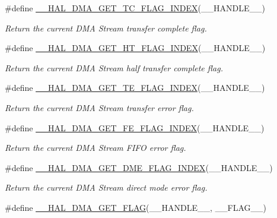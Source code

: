 \begin{DoxyCompactItemize}
\#define \hyperlink{group___d_m_a_gae3feef5ea50ff13a6a5b98cb353c87b0}{\+\_\+\+\_\+\+H\+A\+L\+\_\+\+D\+M\+A\+\_\+\+G\+E\+T\+\_\+\+T\+C\+\_\+\+F\+L\+A\+G\+\_\+\+I\+N\+D\+EX}(\+\_\+\+\_\+\+H\+A\+N\+D\+L\+E\+\_\+\+\_\+)
\begin{DoxyCompactList}\small\item\em Return the current D\+MA Stream transfer complete flag. \end{DoxyCompactList}\item 
\#define \hyperlink{group___d_m_a_ga0095f5f3166a82bedc67744ac94acfba}{\+\_\+\+\_\+\+H\+A\+L\+\_\+\+D\+M\+A\+\_\+\+G\+E\+T\+\_\+\+H\+T\+\_\+\+F\+L\+A\+G\+\_\+\+I\+N\+D\+EX}(\+\_\+\+\_\+\+H\+A\+N\+D\+L\+E\+\_\+\+\_\+)
\begin{DoxyCompactList}\small\item\em Return the current D\+MA Stream half transfer complete flag. \end{DoxyCompactList}\item 
\#define \hyperlink{group___d_m_a_ga5e765bb3b1c5fc9f1b1abbbb764250bc}{\+\_\+\+\_\+\+H\+A\+L\+\_\+\+D\+M\+A\+\_\+\+G\+E\+T\+\_\+\+T\+E\+\_\+\+F\+L\+A\+G\+\_\+\+I\+N\+D\+EX}(\+\_\+\+\_\+\+H\+A\+N\+D\+L\+E\+\_\+\+\_\+)
\begin{DoxyCompactList}\small\item\em Return the current D\+MA Stream transfer error flag. \end{DoxyCompactList}\item 
\#define \hyperlink{group___d_m_a_ga5878c3a1dbcf01e6840fffcf1f244088}{\+\_\+\+\_\+\+H\+A\+L\+\_\+\+D\+M\+A\+\_\+\+G\+E\+T\+\_\+\+F\+E\+\_\+\+F\+L\+A\+G\+\_\+\+I\+N\+D\+EX}(\+\_\+\+\_\+\+H\+A\+N\+D\+L\+E\+\_\+\+\_\+)
\begin{DoxyCompactList}\small\item\em Return the current D\+MA Stream F\+I\+FO error flag. \end{DoxyCompactList}\item 
\#define \hyperlink{group___d_m_a_ga23d1f282af3b9aa7aa396dcad94865d8}{\+\_\+\+\_\+\+H\+A\+L\+\_\+\+D\+M\+A\+\_\+\+G\+E\+T\+\_\+\+D\+M\+E\+\_\+\+F\+L\+A\+G\+\_\+\+I\+N\+D\+EX}(\+\_\+\+\_\+\+H\+A\+N\+D\+L\+E\+\_\+\+\_\+)
\begin{DoxyCompactList}\small\item\em Return the current D\+MA Stream direct mode error flag. \end{DoxyCompactList}\item 
\#define \hyperlink{group___d_m_a_ga798d4b3b3fbd32b95540967bb35b35be}{\+\_\+\+\_\+\+H\+A\+L\+\_\+\+D\+M\+A\+\_\+\+G\+E\+T\+\_\+\+F\+L\+AG}(\+\_\+\+\_\+\+H\+A\+N\+D\+L\+E\+\_\+\+\_\+,  \+\_\+\+\_\+\+F\+L\+A\+G\+\_\+\+\_\+)

\end{DoxyCompactItemize}
